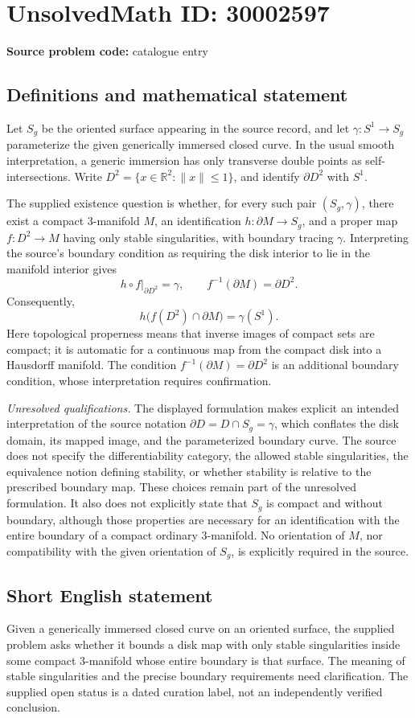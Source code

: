 \documentclass[11pt]{article}
\newcommand{\R}{\mathbb{R}}
\begin{document}
\section*{UnsolvedMath ID: 30002597}
\textbf{Source problem code:} catalogue entry
\subsection{Definitions and mathematical statement}
Let \(S_g\) be the oriented surface appearing in the source record, and let \(\gamma\colon S^1\to S_g\) parameterize the given generically immersed closed curve. In the usual smooth interpretation, a generic immersion has only transverse double points as self-intersections. Write \(D^2=\{x\in\R^2:\|x\|\leq 1\}\), and identify \(\partial D^2\) with \(S^1\).

The supplied existence question is whether, for every such pair \((S_g,\gamma)\), there exist a compact \(3\)-manifold \(M\), an identification \(h\colon\partial M\to S_g\), and a proper map \(f\colon D^2\to M\) having only stable singularities, with boundary tracing \(\gamma\). Interpreting the source's boundary condition as requiring the disk interior to lie in the manifold interior gives
\[
 h\circ f|_{\partial D^2}=\gamma,
 \qquad f^{-1}(\partial M)=\partial D^2.
\]
Consequently,
\[
 h\bigl(f(D^2)\cap\partial M\bigr)=\gamma(S^1).
\]
Here topological properness means that inverse images of compact sets are compact; it is automatic for a continuous map from the compact disk into a Hausdorff manifold. The condition \(f^{-1}(\partial M)=\partial D^2\) is an additional boundary condition, whose interpretation requires confirmation.

\emph{Unresolved qualifications.} The displayed formulation makes explicit an intended interpretation of the source notation \(\partial D=D\cap S_g=\gamma\), which conflates the disk domain, its mapped image, and the parameterized boundary curve. The source does not specify the differentiability category, the allowed stable singularities, the equivalence notion defining stability, or whether stability is relative to the prescribed boundary map. These choices remain part of the unresolved formulation. It also does not explicitly state that \(S_g\) is compact and without boundary, although those properties are necessary for an identification with the entire boundary of a compact ordinary \(3\)-manifold. No orientation of \(M\), nor compatibility with the given orientation of \(S_g\), is explicitly required in the source.
\subsection{Short English statement}
Given a generically immersed closed curve on an oriented surface, the supplied problem asks whether it bounds a disk map with only stable singularities inside some compact \(3\)-manifold whose entire boundary is that surface. The meaning of stable singularities and the precise boundary requirements need clarification. The supplied open status is a dated curation label, not an independently verified conclusion.
\end{document}
